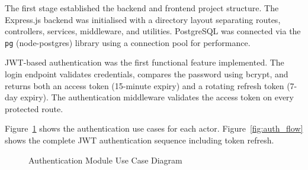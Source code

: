 \documentclass[12pt,a4paper]{report}
\begin{document}
The first stage established the backend and frontend project structure. The Express.js backend was initialised with a directory layout separating routes, controllers, services, middleware, and utilities. PostgreSQL was connected via the \texttt{pg} (node-postgres) library using a connection pool for performance.

JWT-based authentication was the first functional feature implemented. The login endpoint validates credentials, compares the password using bcrypt, and returns both an access token (15-minute expiry) and a rotating refresh token (7-day expiry). The authentication middleware validates the access token on every protected route.

Figure~\ref{fig:auth_usecase} shows the authentication use cases for each actor. Figure~\ref{fig:auth_flow} shows the complete JWT authentication sequence including token refresh.

\begin{figure}[H]
\centering
{}
\caption{Authentication Module Use Case Diagram}
\label{fig:auth_usecase}
\end{figure}
\end{document}
